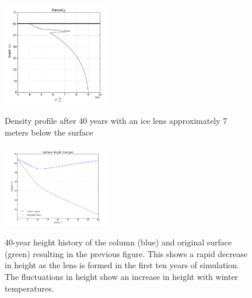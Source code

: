 \documentclass{article}%
\begin{document}
\begin{figure}[H]
	\centering
		\includegraphics[width=0.42\textwidth]{images/40yrDen.png}
	\label{fig:500 year orbit}
	\caption{\footnotesize Density profile after 40 years with an ice lens approximately 7 meters below the surface}
\end{figure}

\begin{figure}[H]
	\centering
		\includegraphics[width=0.42\textwidth]{images/40yrHt.png}
	\label{fig:500 year orbit}
	\caption{\footnotesize 40-year height history of the column (blue) and original surface (green) resulting in the previous figure.  This shows a rapid decrease in height as the lens is formed in the first ten years of simulation.  The fluctuations in height show an increase in height with winter temperatures.}
\end{figure}
\end{document}
